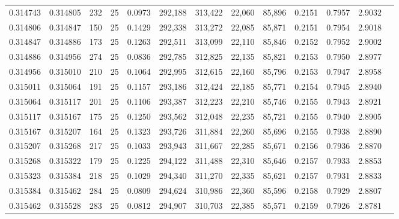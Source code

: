 \begin{tabular}{rrrrrrrrrrrrr}
0.314743 & 0.314805 &   232 &  25 &                                     0.0973 & 292,188 & 313,422 &  22,060 &  85,896 & 0.2151 & 0.7957 & 2.9032 \\
0.314806 & 0.314847 &   150 &  25 &                                     0.1429 & 292,338 & 313,272 &  22,085 &  85,871 & 0.2151 & 0.7954 & 2.9018 \\
0.314847 & 0.314886 &   173 &  25 &                                     0.1263 & 292,511 & 313,099 &  22,110 &  85,846 & 0.2152 & 0.7952 & 2.9002 \\
0.314886 & 0.314956 &   274 &  25 &                                     0.0836 & 292,785 & 312,825 &  22,135 &  85,821 & 0.2153 & 0.7950 & 2.8977 \\
0.314956 & 0.315010 &   210 &  25 &                                     0.1064 & 292,995 & 312,615 &  22,160 &  85,796 & 0.2153 & 0.7947 & 2.8958 \\
0.315011 & 0.315064 &   191 &  25 &                                     0.1157 & 293,186 & 312,424 &  22,185 &  85,771 & 0.2154 & 0.7945 & 2.8940 \\
0.315064 & 0.315117 &   201 &  25 &                                     0.1106 & 293,387 & 312,223 &  22,210 &  85,746 & 0.2155 & 0.7943 & 2.8921 \\
0.315117 & 0.315167 &   175 &  25 &                                     0.1250 & 293,562 & 312,048 &  22,235 &  85,721 & 0.2155 & 0.7940 & 2.8905 \\
0.315167 & 0.315207 &   164 &  25 &                                     0.1323 & 293,726 & 311,884 &  22,260 &  85,696 & 0.2155 & 0.7938 & 2.8890 \\
0.315207 & 0.315268 &   217 &  25 &                                     0.1033 & 293,943 & 311,667 &  22,285 &  85,671 & 0.2156 & 0.7936 & 2.8870 \\
0.315268 & 0.315322 &   179 &  25 &                                     0.1225 & 294,122 & 311,488 &  22,310 &  85,646 & 0.2157 & 0.7933 & 2.8853 \\
0.315323 & 0.315384 &   218 &  25 &                                     0.1029 & 294,340 & 311,270 &  22,335 &  85,621 & 0.2157 & 0.7931 & 2.8833 \\
0.315384 & 0.315462 &   284 &  25 &                                     0.0809 & 294,624 & 310,986 &  22,360 &  85,596 & 0.2158 & 0.7929 & 2.8807 \\
0.315462 & 0.315528 &   283 &  25 &                                     0.0812 & 294,907 & 310,703 &  22,385 &  85,571 & 0.2159 & 0.7926 & 2.8781 \\

\end{tabular}

